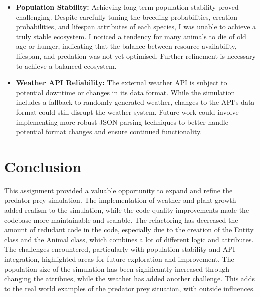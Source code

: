 \documentclass{article}
\begin{document}
\begin{itemize}
    \item \textbf{Population Stability:} Achieving long-term population stability proved challenging. Despite carefully tuning the breeding probabilities, creation probabilities, and lifespan attributes of each species, I was unable to achieve a truly stable ecosystem. I noticed a tendency for many animals to die of old age or hunger, indicating that the balance between resource availability, lifespan, and predation was not yet optimised. Further refinement is necessary to achieve a balanced ecosystem.
    \item \textbf{Weather API Reliability:} The external weather API is subject to potential downtime or changes in its data format. While the simulation includes a fallback to randomly generated weather, changes to the API's data format could still disrupt the weather system. Future work could involve implementing more robust JSON parsing techniques to better handle potential format changes and ensure continued functionality.
\end{itemize}

\section{Conclusion}

This assignment provided a valuable opportunity to expand and refine the predator-prey simulation. The implementation of weather and plant growth added realism to the simulation, while the code quality improvements made the codebase more maintainable and scalable. The refactoring has decreased the amount of redudant code in the code, especially due to the creation of the Entity class and the Animal class, which combines a lot of different logic and attributes. The challenges encountered, particularly with population stability and API integration, highlighted areas for future exploration and improvement. The population size of the simulation has been significantly increased through changing the attribues, while the weather has added another challenge. This adds to the real world examples of the predator prey situation, with outside influences.
\end{document}
